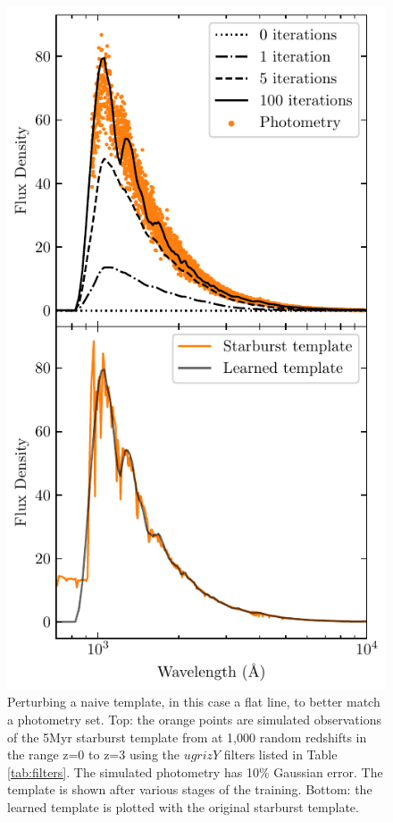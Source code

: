 \begin{figure}
    \centering
    \includegraphics{figures/training_example.pdf}
    \caption{Perturbing a naive template, in this case a flat line, to better match a photometry set. Top: the orange points are simulated observations of the 5Myr starburst template from \citet{Coe2006a} at 1,000 random redshifts in the range z=0 to z=3 using the $ugrizY$ filters listed in Table \ref{tab:filters}. The simulated photometry has 10\% Gaussian error. The template is shown after various stages of the training. Bottom: the learned template is plotted with the original starburst template.}
    \label{fig:pert_ex}
\end{figure}

